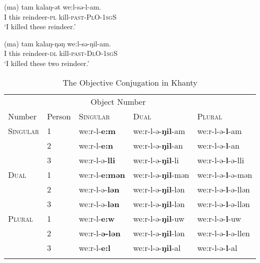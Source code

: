 \documentclass[output=paper
,modfonts
,nonflat]{langsci/langscibook}
\begin{document}
\begin{exe}
\ex \citet[][142-143]{dn2011}
\begin{xlist}
\ex
{\gll (ma) tam kalaŋ-ət we:l-sə-l-am.\\
I this reindeer-\textsc{pl} kill-\textsc{past-PlO-1sgS}\\
\glt `I killed these reindeer.'}

\ex
{\gll (ma) tam kalaŋ-ŋəŋ we:l-sə-ŋil-am.\\
I this reindeer-\textsc{dl} kill-\textsc{past-DlO-1sgS}\\
\glt `I killed these two reindeer.'}

\end{xlist}
\end{exe} \newpage \noindent 



\begin{table}\centering
\caption{\label{tab:objconj}The Objective Conjugation in Khanty \parencite{ostyakgrammar}}
\begin{tabular}{l  l  l l l}
\lsptoprule
\multicolumn{2}{c}{Subject}	&	\multicolumn{3}{c}{Object Number}\\	
Number		&	Person		&	\textsc{Singular}				&	\textsc{Dual}							&	\textsc{Plural}\\
\midrule
\textsc{Singular}	&	1		&	we:r-l-{\bf e:m}					&	we:r-l-ə-{\bf ŋil}-am			&	we:r-l-ə-{\bf l}-am\\
			&	2		&	we:r-l-{\bf e:n}					&	we:r-l-ə-{\bf ŋil}-an			&	we:r-l-ə-{\bf l}-an\\
			&	3		&	we:r-l-ə-{\bf lli}			&	we:r-l-ə-{\bf ŋil}-li			&	we:r-l-ə-{\bf l}-ə-lli\\
\textsc{Dual}	&	1		&	we:r-l-{\bf e:mən}			&	we:r-l-ə-{\bf ŋil}-mən	&	we:r-l-ə-{\bf l}-ə-mən\\
			&	2		&	we:r-l-ə-{\bf lən}		&	we:r-l-ə-{\bf ŋil}-lən	&	we:r-l-ə-{\bf l}-ə-llən\\
			&	3		&	we:r-l-ə-{\bf lən}		&	we:r-l-ə-{\bf ŋil}-lən	&	we:r-l-ə-{\bf l}-ə-llən\\
\textsc{Plural}	&	1		&	we:r-l-{\bf e:w}					&	we:r-l-ə-{\bf ŋil}-uw			&	we:r-l-ə-{\bf l}-uw\\
			&	2		&	we:r-l-{\bf ə-lən}		&	we:r-l-ə-{\bf ŋil}-lən	&	we:r-l-ə-{\bf l}-ə-llen\\
			&	3		&	we:r-l-{\bf e:l}					&	we:r-l-ə-{\bf ŋil}-al			&	we:r-l-ə-{\bf l}-al\\
\lspbottomrule
\end{tabular}

\end{table}
\end{document}
